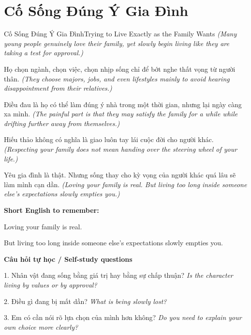\section{Cố Sống Đúng Ý Gia Đình}
\begin{truyen}{Cố Sống Đúng Ý Gia Đình}{Trying to Live Exactly as the Family Wants}
\textit{(Many young people genuinely love their family, yet slowly begin living like they are taking a test for approval.)}

Họ chọn ngành, chọn việc, chọn nhịp sống chỉ để bớt nghe thất vọng từ người thân.
\textit{(They choose majors, jobs, and even lifestyles mainly to avoid hearing disappointment from their relatives.)}

Điều đau là họ có thể làm đúng ý nhà trong một thời gian, nhưng lại ngày càng xa mình.
\textit{(The painful part is that they may satisfy the family for a while while drifting further away from themselves.)}

Hiếu thảo không có nghĩa là giao luôn tay lái cuộc đời cho người khác.
\textit{(Respecting your family does not mean handing over the steering wheel of your life.)}

\end{truyen}

\begin{baihoc}
Yêu gia đình là thật. Nhưng sống thay cho kỳ vọng của người khác quá lâu sẽ làm mình cạn dần.
\textit{(Loving your family is real. But living too long inside someone else’s expectations slowly empties you.)}
\end{baihoc}

\begin{ghinhoanh}
\textbf{Short English to remember:}

Loving your family is real.

But living too long inside someone else’s expectations slowly empties you.

\end{ghinhoanh}

\begin{tuhocnhanh}
\textbf{Câu hỏi tự học / Self-study questions}

1. Nhân vật đang sống bằng giá trị hay bằng sự chấp thuận? \textit{Is the character living by values or by approval?}

2. Điều gì đang bị mất dần? \textit{What is being slowly lost?}

3. Em có cần nói rõ lựa chọn của mình hơn không? \textit{Do you need to explain your own choice more clearly?}
\end{tuhocnhanh}
\ngancach

